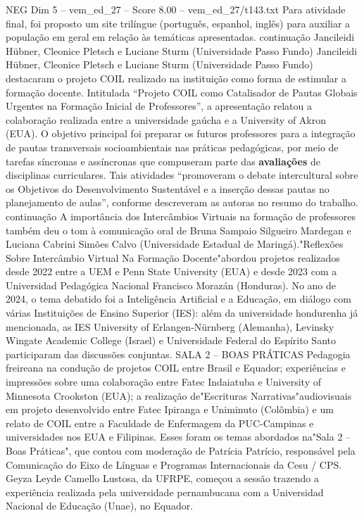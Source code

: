 \begin{textsample}{NEG Dim 5 – vem\_ed\_27 – Score 8.00 – vem\_ed\_27/t143.txt}
Para atividade final, foi proposto um site trilíngue (português, espanhol, inglês) para auxiliar a população em geral em relação às temáticas apresentadas. continuação Jancileidi Hübner, Cleonice Pletsch e Luciane Sturm (Universidade Passo Fundo) Jancileidi Hübner, Cleonice Pletsch e Luciane Sturm (Universidade Passo Fundo) destacaram o projeto COIL realizado na instituição como forma de estimular a formação docente.
Intitulada “Projeto COIL como Catalisador de Pautas Globais Urgentes na Formação Inicial de Professores”, a apresentação relatou a colaboração realizada entre a universidade gaúcha e a University of Akron (EUA).
O objetivo principal foi preparar os futuros professores para a integração de pautas transversais socioambientais nas práticas pedagógicas, por meio de tarefas síncronas e assíncronas que compuseram parte das \textbf{avaliações} de disciplinas curriculares.
Tais atividades “promoveram o debate intercultural sobre os Objetivos do Desenvolvimento Sustentável e a inserção dessas pautas no planejamento de aulas”, conforme descreveram as autoras no resumo do trabalho. continuação A importância dos Intercâmbios Virtuais na formação de professores também deu o tom à comunicação oral de Bruna Sampaio Silgueiro Mardegan e Luciana Cabrini Simões Calvo (Universidade Estadual de Maringá)."Reflexões Sobre Intercâmbio Virtual Na Formação Docente"abordou projetos realizados desde 2022 entre a UEM e Penn State University (EUA) e desde 2023 com a Universidad Pedagógica Nacional Francisco Morazán (Honduras).
No ano de 2024, o tema debatido foi a Inteligência Artificial e a Educação, em diálogo com várias Instituições de Ensino Superior (IES): além da universidade hondurenha já mencionada, as IES University of Erlangen-Nürnberg (Alemanha), Levinsky Wingate Academic College (Israel) e Universidade Federal do Espírito Santo participaram das discussões conjuntas.
SALA 2 – BOAS PRÁTICAS Pedagogia freireana na condução de projetos COIL entre Brasil e Equador; experiências e impressões sobre uma colaboração entre Fatec Indaiatuba e University of Minnesota Crookston (EUA); a realização de"Escrituras Narrativas"audiovisuais em projeto desenvolvido entre Fatec Ipiranga e Uniminuto (Colômbia) e um relato de COIL entre a Faculdade de Enfermagem da PUC-Campinas e universidades nos EUA e Filipinas.
Esses foram os temas abordados na"Sala 2 – Boas Práticas", que contou com moderação de Patrícia Patrício, responsável pela Comunicação do Eixo de Línguas e Programas Internacionais da Cesu / CPS.
Geyza Leyde Camello Lustosa, da UFRPE, começou a sessão trazendo a experiência realizada pela universidade pernambucana com a Universidad Nacional de Educação (Unae), no Equador.

\end{textsample}
